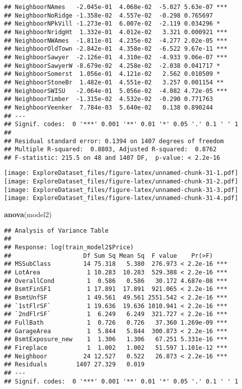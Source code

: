 \documentclass[]{article}
\newenvironment{Shaded}{\begin{snugshade}}{\end{snugshade}}
\newcommand{\KeywordTok}[1]{\textcolor[rgb]{0.13,0.29,0.53}{\textbf{#1}}}
\newcommand{\NormalTok}[1]{#1}
\begin{document}
\begin{verbatim}
## NeighboorNAmes   -2.045e-01  4.068e-02  -5.027 5.63e-07 ***
## NeighboorNoRidge -1.358e-02  4.557e-02  -0.298 0.765697    
## NeighboorNPkVill -1.273e-01  6.007e-02  -2.119 0.034296 *  
## NeighboorNridgHt  1.332e-01  4.012e-02   3.321 0.000921 ***
## NeighboorNWAmes  -1.811e-01  4.235e-02  -4.277 2.02e-05 ***
## NeighboorOldTown -2.842e-01  4.358e-02  -6.522 9.67e-11 ***
## NeighboorSawyer  -2.126e-01  4.310e-02  -4.933 9.06e-07 ***
## NeighboorSawyerW -8.679e-02  4.258e-02  -2.038 0.041717 *  
## NeighboorSomerst  1.056e-01  4.121e-02   2.562 0.010509 *  
## NeighboorStoneBr  1.482e-01  4.551e-02   3.257 0.001154 ** 
## NeighboorSWISU   -2.064e-01  5.056e-02  -4.082 4.72e-05 ***
## NeighboorTimber  -1.315e-02  4.532e-02  -0.290 0.771763    
## NeighboorVeenker  7.784e-03  5.640e-02   0.138 0.890244    
## ---
## Signif. codes:  0 '***' 0.001 '**' 0.01 '*' 0.05 '.' 0.1 ' ' 1
## 
## Residual standard error: 0.1394 on 1407 degrees of freedom
## Multiple R-squared:  0.8803, Adjusted R-squared:  0.8762 
## F-statistic: 215.5 on 48 and 1407 DF,  p-value: < 2.2e-16
\end{verbatim}

\texttt{[image: ExploreDataset\_files/figure-latex/unnamed-chunk-31-1.pdf]}
\texttt{[image: ExploreDataset\_files/figure-latex/unnamed-chunk-31-2.pdf]}
\texttt{[image: ExploreDataset\_files/figure-latex/unnamed-chunk-31-3.pdf]}
\texttt{[image: ExploreDataset\_files/figure-latex/unnamed-chunk-31-4.pdf]}

\begin{Shaded}
\begin{Highlighting}[]
\KeywordTok{anova}\NormalTok{(model2)}
\end{Highlighting}
\end{Shaded}

\begin{verbatim}
## Analysis of Variance Table
## 
## Response: log(train_model2$Price)
##                    Df Sum Sq Mean Sq  F value    Pr(>F)    
## MSSubClass         14 75.318   5.380  276.973 < 2.2e-16 ***
## LotArea             1 10.283  10.283  529.388 < 2.2e-16 ***
## OverallCond         1  0.586   0.586   30.172 4.687e-08 ***
## BsmtFinSF1          1 17.891  17.891  921.065 < 2.2e-16 ***
## BsmtUnfSF           1 49.561  49.561 2551.542 < 2.2e-16 ***
## `1stFlrSF`          1 19.636  19.636 1010.941 < 2.2e-16 ***
## `2ndFlrSF`          1  6.249   6.249  321.727 < 2.2e-16 ***
## FullBath            1  0.726   0.726   37.360 1.269e-09 ***
## GarageArea          1  5.844   5.844  300.873 < 2.2e-16 ***
## BsmtExposure_new    1  1.306   1.306   67.251 5.331e-16 ***
## Fireplace           1  1.002   1.002   51.597 1.101e-12 ***
## Neighboor          24 12.527   0.522   26.873 < 2.2e-16 ***
## Residuals        1407 27.329   0.019                       
## ---
## Signif. codes:  0 '***' 0.001 '**' 0.01 '*' 0.05 '.' 0.1 ' ' 1
\end{verbatim}
\end{document}
